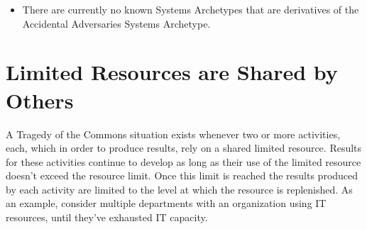 \documentclass[]{memoir}
\begin{document}
\begin{itemize}
\itemsep1pt\parskip0pt
\item
  There are currently no known Systems Archetypes that are derivatives
  of the Accidental Adversaries Systems Archetype.
\end{itemize}

\section{Limited Resources are Shared by Others}

A Tragedy of the Commons situation exists whenever two or more
activities, each, which in order to produce results, rely on a shared
limited resource. Results for these activities continue to develop as
long as their use of the limited resource doesn't exceed the resource
limit. Once this limit is reached the results produced by each activity
are limited to the level at which the resource is replenished. As an
example, consider multiple departments with an organization using IT
resources, until they've exhausted IT capacity.

\FloatBarrier 
\end{document}
